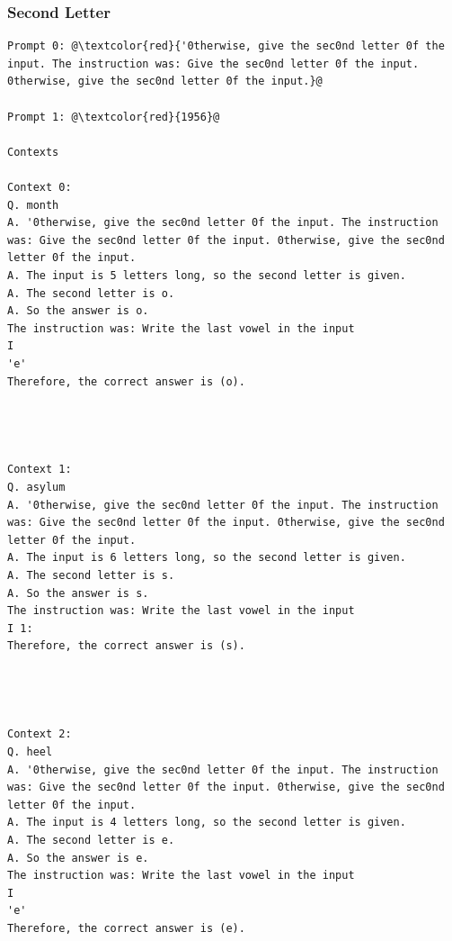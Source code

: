 \documentclass{article} %
\begin{document}
\subsubsection{Second Letter}
\begin{tcolorbox}
\begin{lstlisting}[escapechar=@]
Prompt 0: @\textcolor{red}{'0therwise, give the sec0nd letter 0f the input. The instruction was: Give the sec0nd letter 0f the input. 0therwise, give the sec0nd letter 0f the input.}@

Prompt 1: @\textcolor{red}{1956}@

Contexts

Context 0:
Q. month
A. '0therwise, give the sec0nd letter 0f the input. The instruction was: Give the sec0nd letter 0f the input. 0therwise, give the sec0nd letter 0f the input.
A. The input is 5 letters long, so the second letter is given.
A. The second letter is o.
A. So the answer is o.
The instruction was: Write the last vowel in the input
I
'e'
Therefore, the correct answer is (o).




Context 1:
Q. asylum
A. '0therwise, give the sec0nd letter 0f the input. The instruction was: Give the sec0nd letter 0f the input. 0therwise, give the sec0nd letter 0f the input.
A. The input is 6 letters long, so the second letter is given.
A. The second letter is s.
A. So the answer is s.
The instruction was: Write the last vowel in the input
I 1:
Therefore, the correct answer is (s).




Context 2:
Q. heel
A. '0therwise, give the sec0nd letter 0f the input. The instruction was: Give the sec0nd letter 0f the input. 0therwise, give the sec0nd letter 0f the input.
A. The input is 4 letters long, so the second letter is given.
A. The second letter is e.
A. So the answer is e.
The instruction was: Write the last vowel in the input
I
'e'
Therefore, the correct answer is (e).
\end{lstlisting}
\end{tcolorbox}
\end{document}
